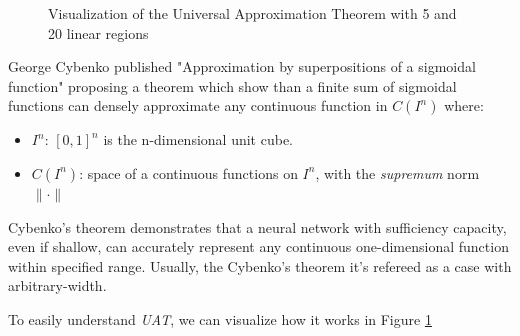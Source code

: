 \documentclass{article}
\begin{document}
\begin{figure}[h]
\caption{Visualization of the Universal Approximation Theorem with 5 and 20 linear regions}
\label{fig:UAT}
\end{figure}

George Cybenko published "Approximation by superpositions of a sigmoidal function" proposing a theorem which show than a finite sum of sigmoidal functions can densely approximate any continuous function in $C(I^n)$ where:
\begin{itemize}
    \item $I^n$: $[0,1]^n$ is the n-dimensional unit cube.
    \item $C(I^n)$: space of a continuous functions on $I^n$, with the \textit{supremum} norm $\| \cdot \|$
\end{itemize}

Cybenko's theorem demonstrates that a neural network with sufficiency capacity, even if shallow, can accurately represent any continuous one-dimensional function within specified range. Usually, the Cybenko's theorem it's refereed as a case with arbitrary-width.

To easily understand \textit{UAT}, we can visualize how it works in Figure \ref{fig:UAT}
\end{document}
